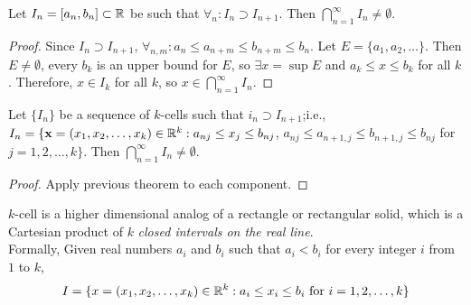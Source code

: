 \begin{theorem}
	\label{thm:2.37}
	Let $I_n = [a_n,b_n] \subset \mathbb{R} $ be such that $\forall_{n}: I_n \supset I_{n+1}$. Then $\bigcap_{n=1}^{\infty}I_n \neq \emptyset$.
	\begin{proof}
		Since $I_n \supset I_{n+1}$, $\forall_{n,m}: a_n \le a_{n+m} \le b_{n+m} \le b_n$.
		Let $E=\{a_1,a_2,\ldots \} $. Then $E \neq \emptyset $, every $b_k$ is an upper bound for $E$, so $\exists x= \sup{E}$ and $a_k \le x \le b_k$ for all $k$.
		Therefore, $x \in I_k$ for all $k$, so $x \in \bigcap_{n=1}^{\infty}I_n$.
	\end{proof}
\end{theorem}

\begin{theorem}
	\label{thm:2.38}
	Let $\{I_n\} $ be a sequence of $k$-cells such that $i_n \supset I_{n+1}$;i.e.,
	$I_n=\{\mathbf{x}=(x_1,x_2, \ldots ,x_k) \in \mathbb{R}^{k}: a_{nj}\le x_j \le b_{nj}$, $a_{nj} \le a_{n+1,j} \le b_{n+1,j} \le b_{nj}$ for $j=1,2,\ldots ,k\}$.
	Then $\bigcap_{n=1}^{\infty}I_n \neq \emptyset$.
	\begin{proof}
		Apply previous theorem to each component.
	\end{proof}
	\begin{note}
		$k$-cell is a higher dimensional analog of a rectangle or rectangular solid, which is a Cartesian product of $k$ \textit{closed intervals on the real line}.\\
		Formally,
		Given real numbers $a_{i}$ and $b_{i}$ such that $a_{i} < b_{i}$ for every integer $i$ from $1$ to $k$,
		\[
			I=\{x=(x_1,x_2, \ldots ,x_k) \in \mathbb{R}^{k}: a_i \le x_i \le b_i \text{ for } i=1,2,\ldots ,k\}
		\]
	\end{note}
\end{theorem}


